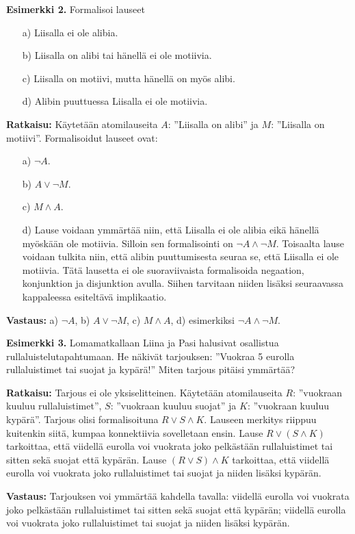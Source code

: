 {\bf Esimerkki 2.}  Formalisoi lauseet
\begin{itemize}
\item[a)] Liisalla ei ole alibia. 
\item[b)] Liisalla on alibi tai hänellä ei ole motiivia.
\item[c)] Liisalla on motiivi, mutta hänellä on myös alibi.
\item[d)] Alibin puuttuessa Liisalla ei ole motiivia. 
\end{itemize}

{\bf Ratkaisu:}
Käytetään atomilauseita $A$: ''Liisalla on alibi'' ja $M$: ''Liisalla on motiivi''.	
Formalisoidut lauseet ovat:
\begin{itemize}
\item[a)] $\lnot A$.
\item[b)] $A \lor \lnot M$.
\item[c)] $M\land A$.
\item[d)] Lause voidaan ymmärtää niin, että Liisalla ei ole alibia eikä hänellä myöskään ole motiivia. Silloin sen formalisointi on $\lnot A \land \lnot M$. Toisaalta lause voidaan tulkita niin, että alibin puuttumisesta seuraa se, että Liisalla ei ole motiivia. Tätä lausetta ei ole suoraviivaista formalisoida negaation, konjunktion ja disjunktion avulla. Siihen tarvitaan niiden lisäksi seuraavassa kappaleessa esiteltävä implikaatio. 
\end{itemize}

{\bf Vastaus:}
a) $\lnot A$, b) $A \lor \lnot M$, c) $M\land A$, d) esimerkiksi 
$\lnot A \land \lnot M$.

{\bf Esimerkki 3.}
Lomamatkallaan Liina ja Pasi halusivat osallistua rullaluistelutapahtumaan. He  näkivät tarjouksen: ''Vuokraa 5 eurolla rullaluistimet tai suojat ja kypärä!'' Miten tarjous pitäisi ymmärtää?

{\bf Ratkaisu:}
Tarjous ei ole yksiselitteinen. Käytetään atomilauseita $R$: ''vuokraan kuuluu rullaluistimet'', $S$: ''vuokraan kuuluu suojat'' ja $K$: ''vuokraan kuuluu kypärä''. Tarjous olisi formalisoituna $R\lor S \land K$. Lauseen merkitys riippuu kuitenkin siitä, kumpaa	konnektiivia sovelletaan ensin. Lause $R\lor (S\land K)$ tarkoittaa, että viidellä eurolla voi vuokrata joko pelkästään rullaluistimet tai sitten sekä suojat että kypärän. Lause $(R\lor S)\land K$ tarkoittaa, että viidellä eurolla voi vuokrata joko rullaluistimet tai suojat ja niiden lisäksi kypärän. 

{\bf Vastaus:} Tarjouksen voi ymmärtää kahdella tavalla:
viidellä eurolla voi vuokrata joko pelkästään rullaluistimet tai sitten sekä suojat että kypärän; viidellä eurolla voi vuokrata joko rullaluistimet tai suojat ja niiden lisäksi kypärän.

